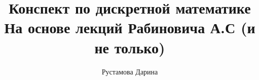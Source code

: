 \documentclass[12pt]{report}
\title{
    Конспект по дискретной математике \\ 
    \large На основе лекций Рабиновича А.С (и не только)}
\author{
    Рустамова Дарина
}
\date{\the\year}
\begin{document}
\maketitle
\tableofcontents

\newcommand\shortlorem{}

\newpage












\shortlorem
\end{document}
